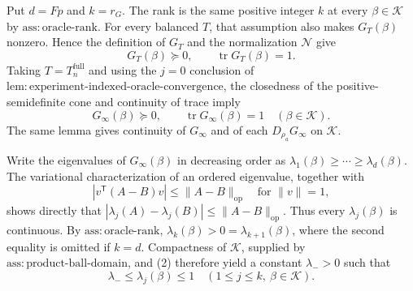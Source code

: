 Put \(d=Fp\) and \(k=r_G\).  The rank is the same positive integer \(k\) at every \(\beta\in\mathcal K\) by \(\mathrm{ass{:}oracle\text{-}rank}\).  For every balanced \(T\), that assumption also makes \(G_T(\beta)\) nonzero.  Hence the definition of \(G_T\) and the normalization \(\mathcal N\) give
\[
G_T(\beta)\succeq0,
\qquad \operatorname{tr}G_T(\beta)=1.
\tag{1}
\]
Taking \(T=T_n^{\mathrm{full}}\) and using the \(j=0\) conclusion of \(\mathrm{lem{:}experiment\text{-}indexed\text{-}oracle\text{-}convergence}\), the closedness of the positive-semidefinite cone and continuity of trace imply
\[
G_\infty(\beta)\succeq0,
\qquad \operatorname{tr}G_\infty(\beta)=1
\quad(\beta\in\mathcal K).
\tag{2}
\]
The same lemma gives continuity of \(G_\infty\) and of each \(D_{\rho_a}G_\infty\) on \(\mathcal K\).

Write the eigenvalues of \(G_\infty(\beta)\) in decreasing order as
\(\lambda_1(\beta)\ge\cdots\ge\lambda_d(\beta)\).  The variational characterization of an ordered eigenvalue, together with
\[
\left|v^{\mathsf T}(A-B)v\right|\leq\lVert A-B\rVert_{\mathrm{op}}
\quad\text{for }\lVert v\rVert=1,
\tag{3}
\]
shows directly that
\(\left|\lambda_j(A)-\lambda_j(B)\right|\leq\lVert A-B\rVert_{\mathrm{op}}\).  Thus every \(\lambda_j(\beta)\) is continuous.  By \(\mathrm{ass{:}oracle\text{-}rank}\),
\(\lambda_k(\beta)>0=\lambda_{k+1}(\beta)\), where the second equality is omitted if \(k=d\).  Compactness of \(\mathcal K\), supplied by \(\mathrm{ass{:}product\text{-}ball\text{-}domain}\), and (2) therefore yield a constant \(\lambda_->0\) such that
\[
\lambda_-\leq\lambda_j(\beta)\leq1
\quad(1\leq j\leq k,\ \beta\in\mathcal K).
\tag{4}
\]

